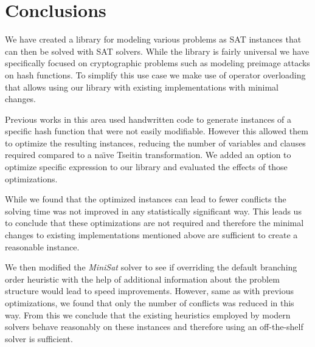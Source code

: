 \section{Conclusions}
We have created a library for modeling various problems as SAT instances that can then be solved with SAT solvers.
While the library is fairly universal we have specifically focused on cryptographic problems such as modeling preimage attacks on hash functions.
To simplify this use case we make use of operator overloading that allows using our library with existing implementations with minimal changes.

Previous works in this area used handwritten code to generate instances of a specific hash function that were not easily modifiable.
However this allowed them to optimize the resulting instances, reducing the number of variables and clauses required compared to a na\"{\i}ve Tseitin transformation.
We added an option to optimize specific expression to our library and evaluated the effects of those optimizations.

While we found that the optimized instances can lead to fewer conflicts the solving time was not improved in any statistically significant way.
This leads us to conclude that these optimizations are not required and therefore the minimal changes to existing implementations mentioned above are sufficient to create a reasonable instance.

We then modified the \emph{MiniSat} solver to see if overriding the default branching order heuristic with the help of additional information about the problem structure would lead to speed improvements.
However, same as with previous optimizations, we found that only the number of conflicts was reduced in this way.
From this we conclude that the existing heuristics employed by modern solvers behave reasonably on these instances and therefore using an off-the-shelf solver is sufficient.